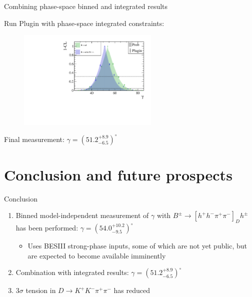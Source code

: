 \documentclass[xcolor={dvipsnames}]{beamer}
\begin{document}
\begin{frame}{Combining phase-space binned and integrated results}
  \begin{center}
    Run Plugin with phase-space integrated constraints:
  \end{center}
  \begin{figure}
    \centering
    \includegraphics[width=0.6\textwidth]{Plots/gamma_plugin_scan_GLW.pdf}
  \end{figure}
  \vspace{-0.3cm}
  \begin{center}
    Final measurement: $\gamma = (51.2_{-6.5}^{+8.9})^\circ$ \\
  \end{center}
\end{frame}

\section{Conclusion and future prospects}
\begin{frame}{Conclusion}
  \vspace{-0.1cm}
  \begin{enumerate}
    \setlength\itemsep{1.5em}
    \item{Binned model-independent measurement of $\gamma$ with $B^\pm\to[h^+h^-\pi^+\pi^-]_Dh^\pm$ has been performed: $\gamma = (54.0_{-9.5}^{+10.2})^\circ$}
    \begin{itemize}
      \item{Uses BESIII strong-phase inputs, some of which are not yet public, but are expected to become available imminently}
    \end{itemize}
    \item{Combination with integrated results: $\gamma = (51.2_{-6.5}^{+8.9})^\circ$}
    \item{$3\sigma$ tension in $D\to K^+K^-\pi^+\pi^-$ has reduced}
  \end{enumerate}
\end{frame}
\end{document}
